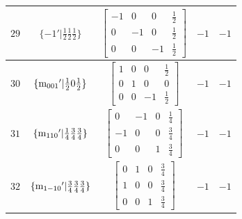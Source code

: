 \documentclass[fleqn,8pt]{jsarticle}
\begin{document}
\begin{longtable}{ccccc}
$ 29 $ & $ \{-1{}'|\frac{1}{2} \frac{1}{2} \frac{1}{2}\} $ & $ \begin{bmatrix} -1 & 0 & 0 & \frac{1}{2} \\ 0 & -1 & 0 & \frac{1}{2} \\ 0 & 0 & -1 & \frac{1}{2} \end{bmatrix} $ & $ -1 $ & $ -1 $ \\ \hline
$ 30 $ & $ \{{\rm m}_{001}{}'|\frac{1}{2} 0 \frac{1}{2}\} $ & $ \begin{bmatrix} 1 & 0 & 0 & \frac{1}{2} \\ 0 & 1 & 0 & 0 \\ 0 & 0 & -1 & \frac{1}{2} \end{bmatrix} $ & $ -1 $ & $ -1 $ \\ \hline
$ 31 $ & $ \{{\rm m}_{110}{}'|\frac{1}{4} \frac{3}{4} \frac{3}{4}\} $ & $ \begin{bmatrix} 0 & -1 & 0 & \frac{1}{4} \\ -1 & 0 & 0 & \frac{3}{4} \\ 0 & 0 & 1 & \frac{3}{4} \end{bmatrix} $ & $ -1 $ & $ -1 $ \\ \hline
$ 32 $ & $ \{{\rm m}_{1-10}{}'|\frac{3}{4} \frac{3}{4} \frac{3}{4}\} $ & $ \begin{bmatrix} 0 & 1 & 0 & \frac{3}{4} \\ 1 & 0 & 0 & \frac{3}{4} \\ 0 & 0 & 1 & \frac{3}{4} \end{bmatrix} $ & $ -1 $ & $ -1 $ \\
\end{longtable}
\end{document}
